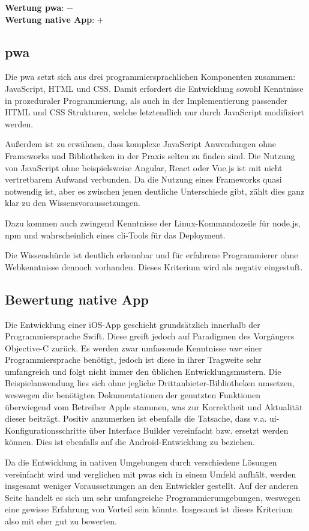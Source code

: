 \textbf{Wertung \ac{pwa}}: $-$\\
\textbf{Wertung native App}: $+$ \\

\subsection{\ac{pwa}}
Die \ac{pwa} setzt sich aus drei programmiersprachlichen Komponenten zusammen: JavaScript, HTML und CSS. Damit erfordert die Entwicklung sowohl Kenntnisse in prozeduraler Programmierung, als auch in der Implementierung passender HTML und CSS Strukturen, welche letztendlich nur durch JavaScript modifiziert werden.

Außerdem ist zu erwähnen, dass komplexe JavaScript Anwendungen ohne Frameworks und Bibliotheken in der Praxis selten zu finden sind. Die Nutzung von JavaScript ohne beispielsweise Angular, React oder Vue.js ist mit nicht vertretbarem Aufwand verbunden. Da die Nutzung eines Frameworks quasi notwendig ist, aber es zwischen jenen deutliche Unterschiede gibt, zählt dies ganz klar zu den Wissensvoraussetzungen.

Dazu kommen auch zwingend Kenntnisse der Linux-Kommandozeile für node.js, npm und wahrscheinlich eines \ac{cli}-Tools für das Deployment.

Die Wissenshürde ist deutlich erkennbar und für erfahrene Programmierer ohne Webkenntnisse dennoch vorhanden. Dieses Kriterium wird als negativ eingestuft.  

\subsection{Bewertung native App}
Die Entwicklung einer iOS-App geschieht grundsätzlich innerhalb der Programmiersprache Swift. Diese greift jedoch auf Paradigmen des Vorgängers Objective-C zurück. Es werden zwar umfassende Kenntnisse \textit{nur} einer Programmiersprache benötigt, jedoch ist diese in ihrer Tragweite sehr umfangreich und folgt nicht immer den üblichen Entwicklungsmustern. Die Beispielanwendung lies sich ohne jegliche Drittanbieter-Bibliotheken umsetzen, weswegen die benötigten Dokumentationen der genutzten Funktionen überwiegend vom Betreiber Apple stammen, was zur Korrektheit und Aktualität dieser beiträgt. Positiv anzumerken ist ebenfalls die Tatsache, dass v.a. \ac{ui}-Konfigurationsschritte über Interface Builder vereinfacht bzw. ersetzt werden können. Dies ist ebenfalls auf die Android-Entwicklung zu beziehen.

Da die Entwicklung in nativen Umgebungen durch verschiedene Lösungen vereinfacht wird und verglichen mit \acp{pwa} sich in einem Umfeld aufhält, werden insgesamt weniger Voraussetzungen an den Entwickler gestellt. Auf der anderen Seite handelt es sich um sehr umfangreiche Programmierumgebungen, weswegen eine gewisse Erfahrung von Vorteil sein könnte. Insgesamt ist dieses Kriterium also mit eher gut zu bewerten.